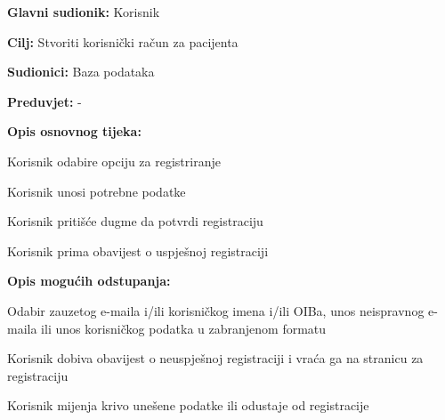 					\noindent {}
					\begin{packed_item}
	
						\item \textbf{Glavni sudionik: }Korisnik
						\item  \textbf{Cilj:} Stvoriti korisnički račun za pacijenta
						\item  \textbf{Sudionici:} Baza podataka
						\item  \textbf{Preduvjet:} -
						\item  \textbf{Opis osnovnog tijeka:}
						
						\item[] \begin{packed_enum}
	
							\item Korisnik odabire opciju za registriranje
							\item Korisnik unosi potrebne podatke
							\item Korisnik pritišće dugme da potvrdi registraciju
							\item Korisnik prima obavijest o uspješnoj registraciji
						\end{packed_enum}
						
						\item  \textbf{Opis mogućih odstupanja:}
						
						\item[] \begin{packed_item}
	
							\item[2.a] Odabir zauzetog e-maila i/ili korisničkog imena i/ili OIBa, unos neispravnog e-maila ili unos korisničkog podatka u zabranjenom formatu
							\item[] \begin{packed_enum}
								
								\item Korisnik dobiva obavijest o neuspješnoj registraciji i vraća ga na stranicu za registraciju
								\item Korisnik mijenja krivo unešene podatke ili odustaje od registracije
								
							\end{packed_enum}
							
						\end{packed_item}
					\end{packed_item}
					
